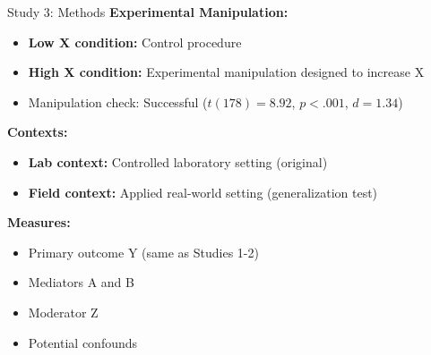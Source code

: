 \documentclass[aspectratio=169,12pt]{beamer}
\begin{document}
\begin{frame}{Study 3: Methods}
  \textbf{Experimental Manipulation:}
  \begin{itemize}
    \item \textbf{Low X condition:} Control procedure
    \item \textbf{High X condition:} Experimental manipulation designed to increase X
    \item Manipulation check: Successful ($t(178) = 8.92$, $p < .001$, $d = 1.34$)
  \end{itemize}

  \vspace{0.5cm}

  \textbf{Contexts:}
  \begin{itemize}
    \item \textbf{Lab context:} Controlled laboratory setting (original)
    \item \textbf{Field context:} Applied real-world setting (generalization test)
  \end{itemize}

  \vspace{0.5cm}

  \textbf{Measures:}
  \begin{itemize}
    \item Primary outcome Y (same as Studies 1-2)
    \item Mediators A and B
    \item Moderator Z
    \item Potential confounds
  \end{itemize}
\end{frame}
\end{document}
